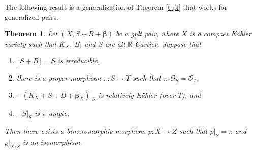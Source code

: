 \documentclass[12pt]{amsart}
\theoremstyle{plain}
\newtheorem{theorem}{Theorem}[section]
\theoremstyle{remark}
\theoremstyle{definition}
\newcommand{\<}{\leq}
\newcommand{\OO}{{\mathcal{O}}}
\def\lrd{\lfloor}
\def\rrd{\rfloor}
\def\lrd{\lfloor}
\def\rrd{\rfloor}
\def\bbeta{\boldsymbol{\beta}}
\theoremstyle{definition}
\theoremstyle{definition}
\numberwithin{equation}{section}
\theoremstyle{remark}
\begin{document}
The following result is a generalization of Theorem \ref{t-pl} that works for generalized pairs.

\begin{theorem}\label{t-ext}
Let $(X,S+B+\bbeta )$ be a gplt pair, where $X$ is a compact K\"ahler variety such that $K_X$, $B$, and $S$ are all $\mathbb R$-Cartier. Suppose that 
\begin{enumerate}
    \item $\lrd S+B\rrd=S$ is irreducible, 
    \item there is a proper morphism $\pi:S\to T$ such that $\pi _*\OO_S=\OO_T$,
    \item $-(K_X+S+B+\bbeta_X)|_S$ is relatively K\"ahler (over $T$), and 
    \item $-S|_S$
is $\pi$-ample.
\end{enumerate}  Then there exists a bimeromorphic morphism $p:X\to Z$ such that $p|_S=\pi$ and $p|_{X\setminus S}$ is an isomorphism.
\end{theorem}
\end{document}
